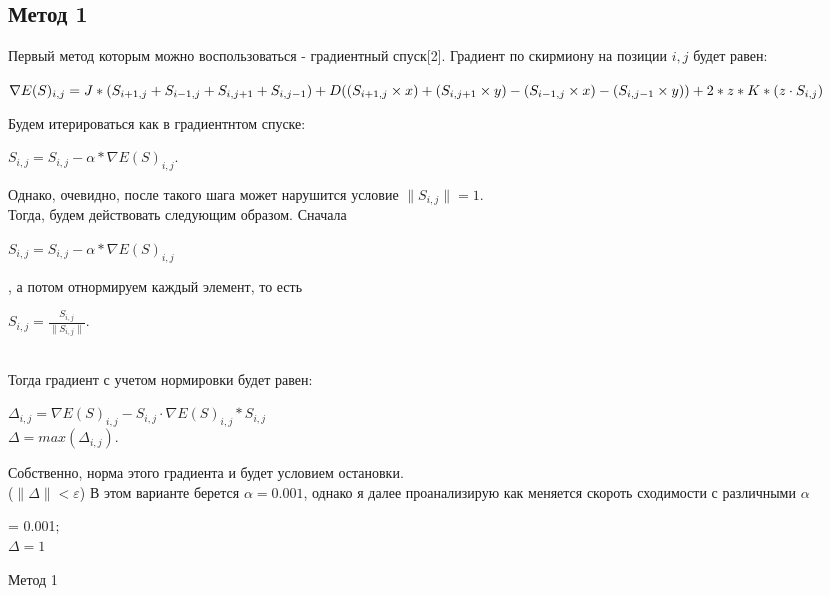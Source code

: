 \documentclass[ 12pt,x11names]{article}
\begin{document}
    \subsection{Метод 1}
    Первый метод которым можно воспользоваться  - градиентный спуск[2]. Градиент по скирмиону на позиции $i, j$ будет равен:
      \begin{center}
    $\nabla E(S)_{i, j} = J * (S_{i + 1,j} + S_{i - 1,j} + S_{i, j + 1} + S_{i, j - 1})
        + \\ D  ( (S_{i + 1,j} \times x) + (S_{i, j + 1} \times y) -  (S_{i - 1, j} \times x) - (S_{i, j - 1} \times y) )\\
        + 2 * z * K * (z \cdot S_{i, j})$\\
          \end{center}
    Будем  итерироваться как в градиентнтом спуске:
    \begin{center}
    $S_{i, j} = S_{i, j} - \alpha * \nabla E(S)_{i, j}$.\\
    \end{center}
    Однако, очевидно, после такого шага может  нарушится условие $\|S_{i, j}\| = 1$.\\
    Тогда, будем действовать следующим образом. Сначала \\
    \begin{center}
    $S_{i, j} = S_{i, j} - \alpha * \nabla E(S)_{i, j}$
    \end{center}, а потом отнормируем каждый элемент, то есть \begin{center}$S_{i, j} = \frac{S_{i, j}}{\|S_{i, j}\|}$.\end{center}\\
    Тогда градиент с учетом нормировки будет равен:\\
    \begin{center}
    $\Delta_{i, j} = \nabla E(S)_{i, j} - S_{i, j} \cdot \nabla E(S)_{i, j} * S_{i, j}$\\
    $\Delta = max(\Delta_{i, j}).$\\
    \end{center}
    Собственно, норма этого градиента и будет условием остановки.\\
    ($\| \Delta \|< \varepsilon$)
    В этом варианте берется $\alpha = 0.001$, однако я далее проанализирую как меняется скороть сходимости  с различными $\alpha$
    \begin{algorithm}[H]
		\SetAlgoLined
		\alpha = 0.001;\\
		$ \Delta  = 1$\\
	\caption{Метод 1}
    \end{algorithm}
\end{document}
